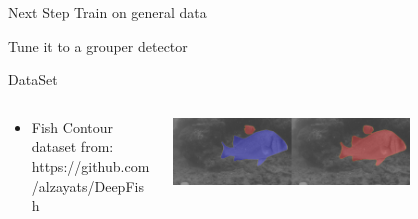 \begin{frame}{Next Step}
    Train on general data

    Tune it to a grouper detector

\end{frame}

\begin{frame}{DataSet}
    \begin{columns}
        \begin{column}{0.5\textwidth}
            \begin{itemize}
                \item Fish Contour dataset from: https://github.com/alzayats/DeepFish
            \end{itemize}
        \end{column}
        \begin{column}{0.5\textwidth}
            \centering
            \includegraphics[height=0.7\textheight,width=0.7\textwidth,keepaspectratio]{images/gm_segmentation.png}
        \end{column}
    \end{columns}
\end{frame}




